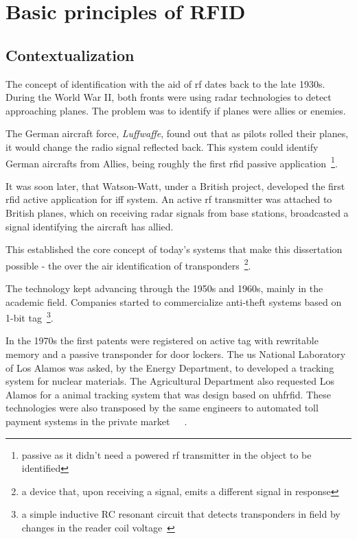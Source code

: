 \chapter{Basic principles of RFID}

\section{Contextualization}

The concept of identification with the aid of \ac{rf} dates back to the late 1930s. During the World War II, both fronts were using radar technologies to detect approaching planes. The problem was to identify if planes were allies or enemies.

The German aircraft force, \emph{Luffwaffe}, found out that as pilots rolled their planes, it would change the radio signal reflected back. This system could identify German aircrafts from Allies, being roughly the first \ac{rfid} passive application~\footnote{passive as it didn't need a powered \ac{rf} transmitter in the object to be identified}.~\cite{dobkinRFRFIDPassive2007}

It was soon later, that Watson-Watt, under a British project, developed the first \ac{rfid} active application for \ac{iff} system. An active \ac{rf} transmitter was attached to British planes, which on receiving radar signals from base stations, broadcasted a signal identifying the aircraft has allied.~\cite{HistoryRFIDTechnology}

This established the core concept of today's systems that make this dissertation possible - the over the air identification of transponders~\footnote{a device that, upon receiving a signal, emits a different signal in response}.

The technology kept advancing through the 1950s and 1960s, mainly in the academic field. Companies started to commercialize anti-theft systems based on 1-bit tag~\footnote{a simple inductive RC resonant circuit that detects transponders in field by changes in the reader coil voltage~\cite{andreventuradacruzmarnotozuqueteIdentificacaoPorRFID2018}}.

In the 1970s the first patents were registered on active tag with rewritable memory and a passive transponder for door lockers. The \ac{us} National Laboratory of Los Alamos was asked, by the Energy Department, to developed a tracking system for nuclear materials. The Agricultural Department also requested Los Alamos for a animal tracking system that was design based on \ac{uhfrfid}. These technologies were also transposed by the same engineers to automated toll payment systems in the private market~\cite{landtHistoryRFID2005}~\cite{HistoryRFIDTechnology}~\cite{casierAnalogCircuitDesign2011}.

